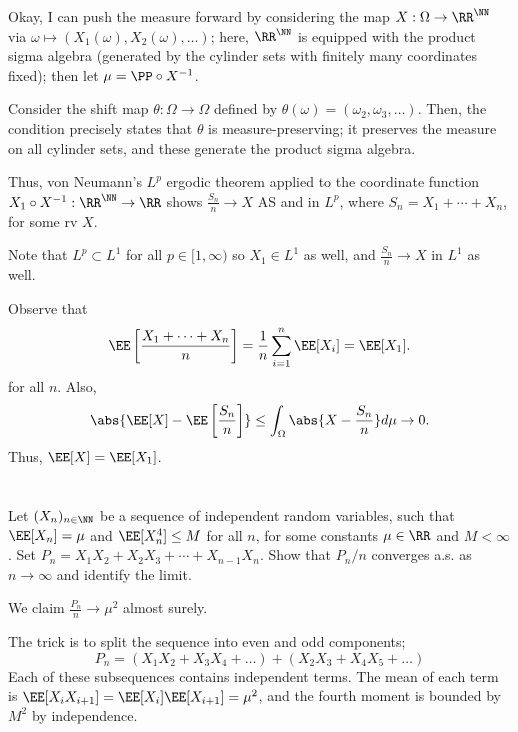 \documentclass[11pt, headheight=30pt]{scrartcl}
\begin{document}
Okay, I can push the measure forward by considering the map $X:\Omega \to \RR^\NN$
via $\omega \mapsto (X_1(\omega), X_2(\omega), \ldots)$; here, $\RR^\NN$
is equipped with the product sigma algebra (generated by the cylinder sets
with finitely many coordinates fixed); then let $\mu = \PP\circ X^{-1}$.

Consider the shift map $\theta: \Omega \to \Omega$ defined by
$\theta(\omega) = (\omega_2, \omega_3, \ldots)$.
Then, the condition precisely states that $\theta$ is measure-preserving;
it preserves the measure on all cylinder sets, and these generate the
product sigma algebra.

Thus, von Neumann's $L^p$ ergodic theorem applied to the coordinate function
$X_1\circ X^{-1}: \RR^{\NN} \to \RR$ shows $\frac{S_n}{n}\to X$ AS and in $L^p$,
where $S_n = X_1 + \cdots + X_n$, for some rv $X$.

Note that $L^p\subset L^1$ for all $p\in [1,\infty)$ so $X_1 \in L^1$ as well,
and $\frac{S_n}{n}\to X$ in $L^1$ as well.

Observe that
\[
    \EE\left[\frac{X_1 + \dots + X_n}{n}\right] = \frac{1}{n}\sum_{i=1}^n \EE[X_i] = \EE[X_1].    
\]
for all $n$. Also,
\[
    \abs{\EE[X] - \EE\left[\frac{S_n}{n}\right]} \leq \int_{\Omega} \abs{X - \frac{S_n}{n}} d\mu \to 0.    
\]
Thus, $\EE[X] = \EE[X_1]$.



\section{}
\begin{prob*}
    Let $(X_n)_{n \in \NN}$ be a sequence of independent random variables, such that
    $\EE[X_n] = \mu$ and $\EE[X_n^4] \leq M$ for all $n$, for some constants $\mu \in \RR$ and $M < \infty$.
    Set $P_n = X_1 X_2 + X_2 X_3 + \cdots + X_{n-1} X_n$.
    Show that $P_n/n$ converges a.s. as $n \to \infty$ and identify the limit.
\end{prob*}

We claim $\frac{P_n}{n}\to \mu^2$ almost surely.

The trick is to split the sequence into even and odd components;
\[
    P_n = (X_1X_2 + X_3X_4 + \dots) + (X_2X_3 + X_4X_5 + \dots)    
\]
Each of these subsequences contains independent terms. The mean
of each term is $\EE[X_iX_{i + 1}] = \EE[X_i]\EE[X_{i+1}] = \mu^2$,
and the fourth moment is bounded by $M^2$ by independence.
\end{document}
